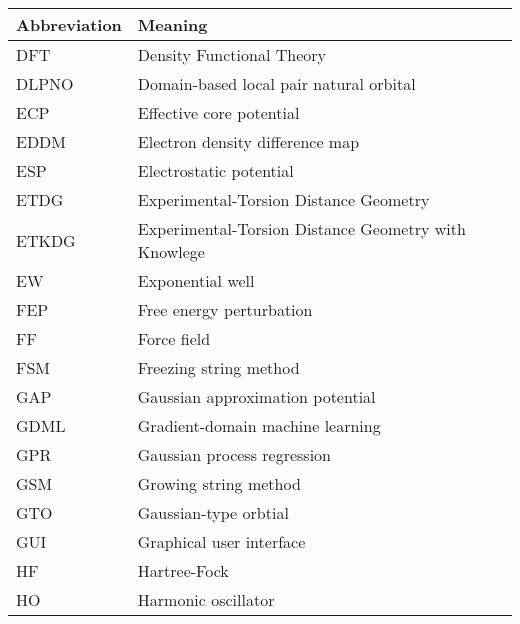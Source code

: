 \documentclass[../main.tex]{subfiles}
\begin{document}
\begin{table}[h!]
\def\arraystretch{2.0}
\begin{tabularx}{\textwidth}{YY}
Abbreviation & Meaning \\
\hline
DFT	&	Density Functional Theory	\\
DLPNO	&	Domain-based local pair natural orbital	\\
ECP	&	Effective core potential	\\
EDDM	&	Electron density difference map	\\
ESP	&	Electrostatic potential	\\
ETDG	&	Experimental-Torsion Distance Geometry	\\
ETKDG	&	Experimental-Torsion Distance Geometry with Knowlege	\\
EW	&	Exponential well	\\
FEP	&	Free energy perturbation	\\
FF	&	Force field	\\
FSM	&	Freezing string method	\\
GAP	&	Gaussian approximation potential	\\
GDML	&	Gradient-domain machine learning	\\
GPR	&	Gaussian process regression	\\
GSM	&	Growing string method	\\
GTO	&	Gaussian-type orbtial	\\
GUI	&	Graphical user interface	\\
HF	&	Hartree-Fock	\\
HO	&	Harmonic oscillator	\\
\end{tabularx}
\end{table}
\newpage
\end{document}
